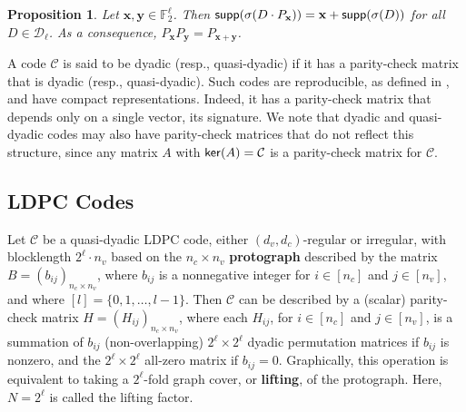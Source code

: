 \documentclass[11pt]{article}
\newtheorem{prop}[lemma]{Proposition}
\theoremstyle{plain}
\theoremstyle{plain}
\theoremstyle{definition}
\numberwithin{theo}{section}
\newcommand{\F}{{\mathbb F}}
\newcommand{\cD}{{\mathcal D}}
\newcommand{\bx}{{\mathbf x}}
\newcommand{\by}{{\mathbf y}}
\def\s{\sigma}
\renewcommand{\sup}{{\sf supp}}
\renewcommand{\ker}{{\sf ker}}
\begin{document}
\begin{prop}\label{P-permutation}
Let $\bx,\by\in \F_2^\ell$. Then $\sup(\s(D\cdot P_{\bx})) = \bx + \sup(\s(D))$ for all $D \in \cD_\ell$.
As a consequence, $P_{\bx} P_{\by} = P_{\bx +\by}$.
\end{prop}

A code $\mathcal C$ is said to be dyadic (resp., quasi-dyadic) if it has a parity-check matrix that is dyadic (resp., quasi-dyadic). Such codes are reproducible, as defined in \cite{SPB22}, and have compact representations. Indeed, it has a parity-check matrix that depends only on a single vector, its signature. We note that dyadic and quasi-dyadic codes may also have parity-check matrices that do not reflect this structure, since any matrix $A$ with $\ker(A)=\mathcal C$ is a parity-check matrix for $\mathcal C$.     


\subsection{LDPC Codes}

Let $\mathcal{C}$ be a quasi-dyadic LDPC code, either $(d_v,d_c)$-regular or irregular, with blocklength $2^\ell\cdot n_v$ based on the $n_c\times n_v$ \textbf{protograph} \cite{tho03} described by the matrix $B={(b_{ij})}_{n_c\times n_v}$, where $b_{ij}$ is a nonnegative integer for $i\in[n_c]$ and $j\in[n_v]$, and where $[l]=\{0,1,\dots,l-1\}$. Then $\mathcal{C}$ can be described by a (scalar) parity-check matrix $H={(H_{ij})}_{n_c\times n_v}$, where each $H_{ij}$, for $i\in[n_c]$ and $j\in[n_v]$, is a summation of $b_{ij}$ (non-overlapping) $2^\ell\times 2^\ell$ dyadic permutation matrices if $b_{ij}$ is nonzero, and the $2^\ell\times 2^\ell$ all-zero matrix if $b_{ij}=0$. Graphically, this operation is equivalent to taking a $2^\ell$-fold graph cover, or \textbf{lifting}, of the protograph. Here, $N=2^\ell$ is called the lifting factor. 
\end{document}
